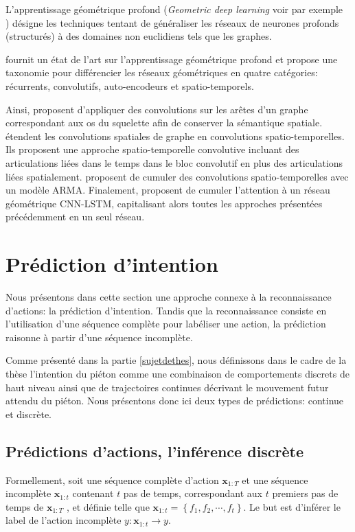 L'apprentissage géométrique profond (\textit{Geometric deep learning} voir par exemple \\ \cite{gori2005new,scarselli2008graph,bronstein2017geometric}) désigne les techniques tentant de généraliser les réseaux de neurones profonds (structurés) à des domaines non euclidiens tels que les graphes. 

\cite{wu2019comprehensive} fournit un état de l'art sur l'apprentissage géométrique profond et propose une taxonomie pour différencier les réseaux géométriques en quatre catégories: récurrents, convolutifs, auto-encodeurs et spatio-temporels.

Ainsi, \cite{2018arXiv180506184Z} proposent d'appliquer des convolutions sur les arêtes d'un graphe correspondant aux os du squelette afin de conserver la sémantique spatiale.
\cite{yan2018spatial} étendent les convolutions spatiales de graphe en convolutions spatio-temporelles. Ils proposent une approche spatio-temporelle convolutive incluant des articulations liées dans le temps dans le bloc convolutif en plus des articulations liées spatialement. \cite{2018arXiv180209834L} proposent de cumuler des convolutions spatio-temporelles avec un modèle ARMA. Finalement,  \cite{Si_2019_CVPR} proposent de cumuler l'attention à un réseau géométrique CNN-LSTM, capitalisant alors toutes les approches présentées précédemment en un seul réseau.

\section{Prédiction d'intention}
Nous présentons dans cette section une approche connexe à la reconnaissance d'actions: la prédiction d'intention. Tandis que la reconnaissance consiste en l'utilisation d'une séquence complète pour labéliser une action, la prédiction raisonne à partir d'une séquence incomplète. 

Comme présenté dans la partie \ref{sujetdethes}, nous définissons dans le cadre de la thèse l'intention du piéton comme une combinaison de comportements discrets de haut niveau ainsi que de trajectoires continues décrivant le mouvement futur attendu du piéton. Nous présentons donc ici deux types de prédictions: continue et discrète.

\subsection{Prédictions d'actions, l'inférence discrète}
Formellement, soit une séquence complète d'action $\mathbf{x}_{1: T}$ et une séquence incomplète $\mathbf{x}_{1: t}$ contenant $t$ pas de temps, correspondant aux $t$ premiers pas de temps de $\mathbf{x}_{1: T}$ , et définie telle que $\mathbf{x}_{1: t}=\left\{f_{1}, f_{2}, \cdots, f_{t}\right\}$. Le but est d'inférer le label de l'action incomplète $y: \mathbf{x}_{1: t} \rightarrow y$.\\

